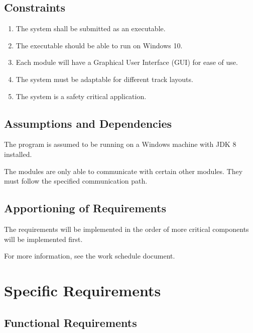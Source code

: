 \documentclass[11pt]{article}
\begin{document}
\subsection{Constraints}
\label{sec-2-4}
\begin{enumerate}
\item The system shall be submitted as an executable.
\item The executable should be able to run on Windows 10.
\item Each module will have a Graphical User Interface (GUI) for ease of use.
\item The system must be adaptable for different track layouts.
\item The system is a safety critical application.
\end{enumerate}

\subsection{Assumptions and Dependencies}
\label{sec-2-5}
The program is assumed to be running on a Windows machine with JDK 8 installed.

The modules are only able to communicate with certain other modules. They must follow the specified communication path.
\subsection{Apportioning of Requirements}
\label{sec-2-6}

The requirements will be implemented in the order of more critical components will be implemented first.

For more information, see the work schedule document.
\section{Specific Requirements}
\label{sec-3}
\subsection{Functional Requirements}
\label{sec-3-1}
\end{document}

